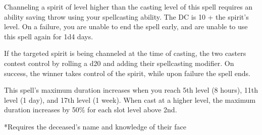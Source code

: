 Channeling a spirit of level higher than the casting level of this spell requires an ability saving throw using your spellcasting ability. The DC is 10 + the spirit's level. On a failure, you are unable to end the spell early, and are unable to use this spell again for 1d4 days.

If the targeted spirit is being channeled at the time of casting, the two casters contest control by rolling a d20 and adding their spellcasting modifier. On success, the winner takes control of the spirit, while upon failure the spell ends.

This spell's maximum duration increases when you reach 5th level (8 hours), 11th level (1 day), and 17th level (1 week). When cast at a higher level, the maximum duration increases by 50\% for each slot level above 2nd.

*Requires the deceased's name and knowledge of their face
